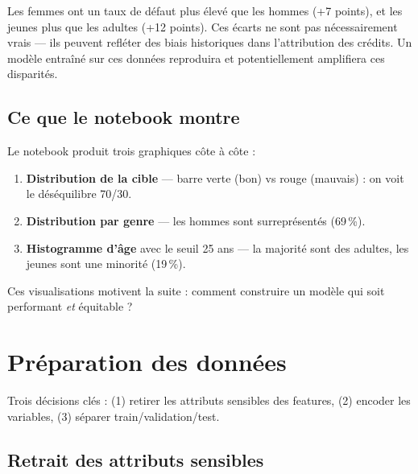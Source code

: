 \documentclass[11pt, a4paper]{article}
\begin{document}
\begin{leconbox}[Le\c{c}on cl\'{e}]
Les femmes ont un taux de d\'{e}faut plus \'{e}lev\'{e} que les hommes (+7 points), et les jeunes plus que les adultes (+12 points). Ces \'{e}carts ne sont pas n\'{e}cessairement \og vrais \fg{} --- ils peuvent refl\'{e}ter des biais historiques dans l'attribution des cr\'{e}dits. Un mod\`{e}le entra\^{i}n\'{e} sur ces donn\'{e}es reproduira et potentiellement amplifiera ces disparit\'{e}s.
\end{leconbox}

\subsection{Ce que le notebook montre}

Le notebook produit trois graphiques c\^{o}te \`{a} c\^{o}te :
\begin{enumerate}
    \item \textbf{Distribution de la cible} --- barre verte (bon) vs rouge (mauvais) : on voit le d\'{e}s\'{e}quilibre 70/30.
    \item \textbf{Distribution par genre} --- les hommes sont surrepr\'{e}sent\'{e}s (69\,\%).
    \item \textbf{Histogramme d'\^{a}ge} avec le seuil 25 ans --- la majorit\'{e} sont des adultes, les jeunes sont une minorit\'{e} (19\,\%).
\end{enumerate}

Ces visualisations motivent la suite : comment construire un mod\`{e}le qui soit performant \emph{et} \'{e}quitable ?

\section{Pr\'{e}paration des donn\'{e}es}
\label{sec:prep}

\begin{questionbox}
Trois d\'{e}cisions cl\'{e}s : (1) retirer les attributs sensibles des features, (2) encoder les variables, (3) s\'{e}parer train/validation/test.
\end{questionbox}

\subsection{Retrait des attributs sensibles}
\end{document}

